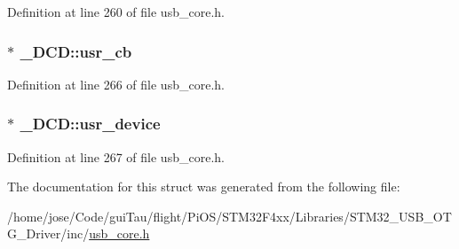 Definition at line 260 of file usb\-\_\-core.\-h.

\hypertarget{struct___d_c_d_affc1e2e5b5120420657b34dffdbb0b1f}{
\subsubsection[{usr\-\_\-cb}]{$\ast$ \-\_\-\-D\-C\-D\-::usr\-\_\-cb}}\label{struct___d_c_d_affc1e2e5b5120420657b34dffdbb0b1f}


Definition at line 266 of file usb\-\_\-core.\-h.

\hypertarget{struct___d_c_d_a2a04030a710ea9b67d6392a155502e82}{
\subsubsection[{usr\-\_\-device}]{$\ast$ \-\_\-\-D\-C\-D\-::usr\-\_\-device}}\label{struct___d_c_d_a2a04030a710ea9b67d6392a155502e82}


Definition at line 267 of file usb\-\_\-core.\-h.



The documentation for this struct was generated from the following file\-:\begin{DoxyCompactItemize}
\item 
/home/jose/\-Code/gui\-Tau/flight/\-Pi\-O\-S/\-S\-T\-M32\-F4xx/\-Libraries/\-S\-T\-M32\-\_\-\-U\-S\-B\-\_\-\-O\-T\-G\-\_\-\-Driver/inc/\hyperlink{_s_t_m32_f4xx_2_libraries_2_s_t_m32___u_s_b___o_t_g___driver_2inc_2usb__core_8h}{usb\-\_\-core.\-h}\end{DoxyCompactItemize}
